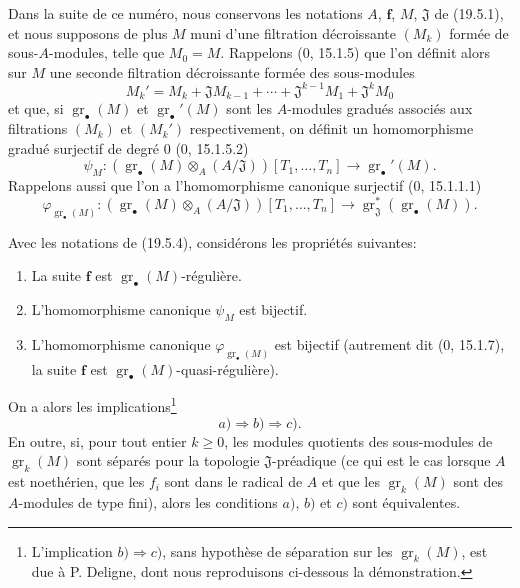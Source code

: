 \begin{env}[19.5.4]
\label{IV.19.5.4}
Dans la suite de ce numéro, nous conservons les notations $A$, $\mathbf f$, $M$, $\mathfrak J$ de (19.5.1), et nous supposons de plus $M$ muni d'une filtration décroissante $(M_k)$ formée de sous-$A$-modules, telle que $M_0=M$. Rappelons ($0$, 15.1.5) que l'on définit alors sur $M$ une seconde filtration décroissante formée des sous-modules
\[
  M_k'=M_k+\mathfrak JM_{k-1}+\cdots+\mathfrak J^{k-1}M_1+\mathfrak J^kM_0
\]
et que, si $\operatorname{gr}_\bullet(M)$ et $\operatorname{gr}_\bullet'(M)$ sont les $A$-modules gradués associés aux filtrations $(M_k)$ et $(M_k')$ respectivement, on définit un homomorphisme gradué surjectif de degré $0$ ($0$, 15.1.5.2)
\[
  \psi_M:(\operatorname{gr}_\bullet(M)\otimes_A(A/\mathfrak J))[T_1,\ldots,T_n]\longrightarrow\operatorname{gr}_\bullet'(M).
\]
Rappelons aussi que l'on a l'homomorphisme canonique surjectif ($0$, 15.1.1.1)
\[
  \varphi_{\operatorname{gr}_\bullet(M)}:(\operatorname{gr}_\bullet(M)\otimes_A(A/\mathfrak J))[T_1,\ldots,T_n]\longrightarrow\operatorname{gr}_{\mathfrak J}^*(\operatorname{gr}_\bullet(M)).
\]
\end{env}

\begin{theorem}[19.5.5]
\label{IV.19.5.5}
Avec les notations de (19.5.4), considérons les propriétés suivantes:
\begin{enumerate}
  \item[a)] La suite $\mathbf f$ est $\operatorname{gr}_\bullet(M)$-régulière.
  \item[b)] L'homomorphisme canonique $\psi_M$ est bijectif.
  \item[c)] L'homomorphisme canonique $\varphi_{\operatorname{gr}_\bullet(M)}$ est bijectif (autrement dit ($0$, 15.1.7), la suite $\mathbf f$ est $\operatorname{gr}_\bullet(M)$-quasi-régulière).
\end{enumerate}


On a alors les implications\footnote{L'implication $b)\Rightarrow c)$, sans hypothèse de séparation sur les $\operatorname{gr}_k(M)$, est due à P. Deligne, dont nous reproduisons ci-dessous la démonstration.}
\[
  a)\Rightarrow b)\Rightarrow c).
\]
En outre, si, pour tout entier $k\geq0$, les modules quotients des sous-modules de $\operatorname{gr}_k(M)$ sont séparés pour la topologie $\mathfrak J$-préadique (ce qui est le cas lorsque $A$ est noethérien, que les $f_i$ sont dans le radical de $A$ et que les $\operatorname{gr}_k(M)$ sont des $A$-modules de type fini), alors les conditions $a)$, $b)$ et $c)$ sont équivalentes.
\end{theorem}

